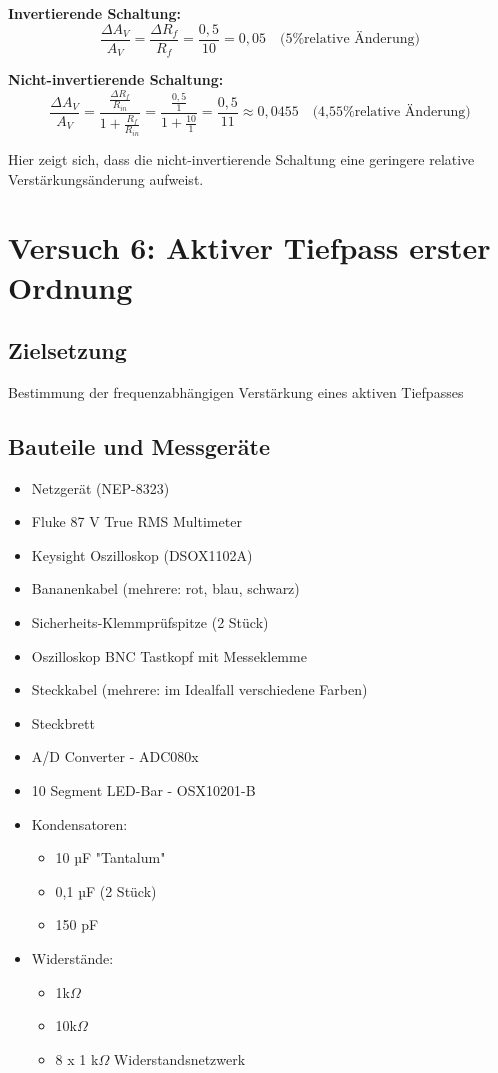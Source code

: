 \documentclass[a4paper,12pt]{article}
\begin{document}
\textbf{Invertierende Schaltung:}
\[
\frac{\Delta A_V}{A_V} = \frac{\Delta R_f}{R_f} = \frac{0,5}{10} = 0,05 \quad \text{(5\% relative Änderung)}
\]

\textbf{Nicht-invertierende Schaltung:}
\[
\frac{\Delta A_V}{A_V} = \frac{\frac{\Delta R_f}{R_{in}}}{1 + \frac{R_f}{R_{in}}} = \frac{\frac{0,5}{1}}{1 + \frac{10}{1}} = \frac{0,5}{11} \approx 0,0455 \quad \text{(4,55\% relative Änderung)}
\]

\noindent Hier zeigt sich, dass die nicht-invertierende Schaltung eine geringere relative Verstärkungsänderung aufweist.


\section{Versuch 6: Aktiver Tiefpass erster Ordnung}
\subsection{Zielsetzung}
Bestimmung der frequenzabhängigen Verstärkung eines aktiven Tiefpasses

\subsection{Bauteile und Messgeräte}
\begin{itemize}
\item Netzgerät (NEP-8323)
\item Fluke 87 V True RMS Multimeter
\item Keysight Oszilloskop (DSOX1102A)
\item Bananenkabel (mehrere: rot, blau, schwarz)
\item Sicherheits-Klemmprüfspitze (2 Stück)
\item Oszilloskop BNC Tastkopf mit Messeklemme
\item Steckkabel (mehrere: im Idealfall verschiedene Farben)
\item Steckbrett\\
\end{itemize}


\begin{itemize}
\item A/D Converter - ADC080x
\item 10 Segment LED-Bar - OSX10201-B
\newpage
\item Kondensatoren: 
	\begin{itemize}
	\item 10 µF "Tantalum"
	\item 0,1 µF (2 Stück)
	\item 150 pF
	\end{itemize}
\item Widerstände: 
	\begin{itemize}
	\item 1k$\Omega$
	\item 10k$\Omega$
	\item 8 x 1 k$\Omega$ Widerstandsnetzwerk
	\end{itemize}
\end{itemize}
\end{document}
